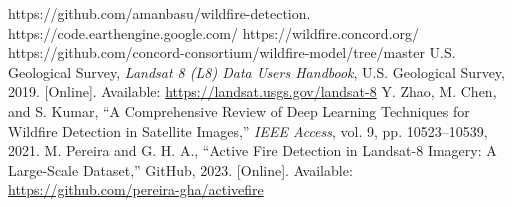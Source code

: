 \documentclass[conference]{IEEEtran}
\begin{document}
\vspace{0.4cm}
\begin{thebibliography}{00}
 https://github.com/amanbasu/wildfire-detection.
 https://code.earthengine.google.com/
 https://wildfire.concord.org/
 https://github.com/concord-consortium/wildfire-model/tree/master
 U.S. Geological Survey, \emph{Landsat 8 (L8) Data Users Handbook}, U.S. Geological Survey, 2019. [Online]. Available: \url{https://landsat.usgs.gov/landsat-8}
 Y. Zhao, M. Chen, and S. Kumar, ``A Comprehensive Review of Deep Learning Techniques for Wildfire Detection in Satellite Images,'' \emph{IEEE Access}, vol. 9, pp. 10523--10539, 2021.
 M. Pereira and G. H. A., ``Active Fire Detection in Landsat-8 Imagery: A Large-Scale Dataset,'' GitHub, 2023. [Online]. Available: \url{https://github.com/pereira-gha/activefire}
\end{thebibliography}
\end{document}
